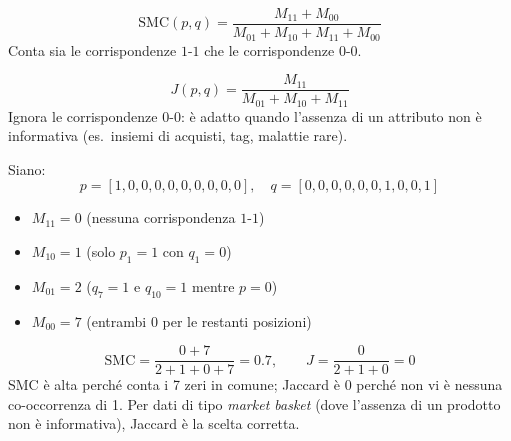 \begin{center}
\end{center}

\begin{definition}
\begin{equation}
  \mathrm{SMC}(p, q) = \frac{M_{11} + M_{00}}{M_{01} + M_{10} + M_{11} + M_{00}}
  \label{eq:smc}
\end{equation}
Conta sia le corrispondenze $1\text{-}1$ che le corrispondenze $0\text{-}0$.
\end{definition}

\begin{definition}
\begin{equation}
  J(p, q) = \frac{M_{11}}{M_{01} + M_{10} + M_{11}}
  \label{eq:jaccard}
\end{equation}
Ignora le corrispondenze $0\text{-}0$: è adatto quando l'assenza di un attributo non è informativa (es.\ insiemi di acquisti, tag, malattie rare).
\end{definition}

\begin{example}
Siano:
\[
  p = [1, 0, 0, 0, 0, 0, 0, 0, 0, 0], \quad q = [0, 0, 0, 0, 0, 0, 1, 0, 0, 1]
\]
\begin{itemize}
  \item $M_{11} = 0$ (nessuna corrispondenza $1\text{-}1$)
  \item $M_{10} = 1$ (solo $p_1=1$ con $q_1=0$)
  \item $M_{01} = 2$ ($q_7=1$ e $q_{10}=1$ mentre $p=0$)
  \item $M_{00} = 7$ (entrambi 0 per le restanti posizioni)
\end{itemize}
\[
  \mathrm{SMC} = \frac{0+7}{2+1+0+7} = 0.7, \qquad J = \frac{0}{2+1+0} = 0
\]
SMC è alta perché conta i 7 zeri in comune; Jaccard è 0 perché non vi è nessuna co-occorrenza di 1. Per dati di tipo \textit{market basket} (dove l'assenza di un prodotto non è informativa), Jaccard è la scelta corretta.
\end{example}

